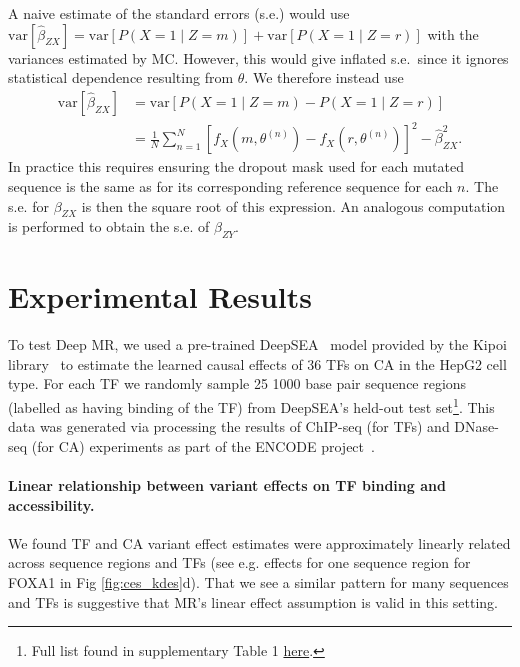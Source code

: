 \documentclass{article}
\begin{document}
A naive estimate of the standard errors (s.e.) would use $\text{var}[\hat{\beta}_{ZX}] = \text{var}{[P(X=1 \mid Z=m)]} + \text{var}{[P(X=1 \mid Z=r)]}$ with the variances estimated by MC. However, this would give inflated s.e.\ since it ignores statistical dependence resulting from $\theta$. We therefore instead use 
\begin{align*}
    \text{var}[\hat{\beta}_{ZX}] &= \text{var}{[P(X=1 \mid Z=m) - P(X=1 \mid Z=r)]} \\
    &= \frac1N \sum_{n=1}^N \left[f_X(m, \theta^{(n)}) - f_X(r, \theta^{(n)})\right]^2 - \hat{\beta}_{ZX}^2. 
\end{align*}
In practice this requires ensuring the dropout mask used for each mutated sequence is the same as for its corresponding reference sequence for each $n$. The s.e. for $\beta_{ZX}$ is then the square root of this expression. An analogous computation is performed to obtain the s.e. of $\beta_{ZY}$. 



\section{Experimental Results}

To test Deep MR, we used a pre-trained DeepSEA~\cite{zhou2015predicting} model provided by the Kipoi library~\cite{avsec2019kipoi} to estimate the learned causal effects of 36 TFs on CA in the HepG2 cell type. For each TF we randomly sample 25 1000 base pair sequence regions (labelled as having binding of the TF) from DeepSEA's held-out test set\footnote{Full list found in supplementary Table 1 \hyperlink{https://www.nature.com/articles/nmeth.3547\#Sec12}{here}.}. This data was generated via processing the results of ChIP-seq (for TFs) and DNase-seq (for CA) experiments as part of the ENCODE project~\cite{encode2004encode}.

\paragraph*{Linear relationship between variant effects on TF binding and accessibility.}
We found TF and CA variant effect estimates were approximately linearly related across sequence regions and TFs (see e.g. effects for one sequence region for FOXA1 in Fig \ref{fig:ces_kdes}d). That we see a similar pattern for many sequences and TFs is suggestive that MR's linear effect assumption is valid in this setting.
\end{document}
